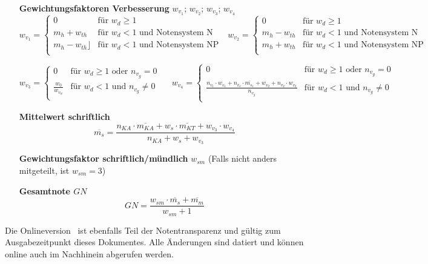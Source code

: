 \begin{enumerate}[label=\textbf{\textbullet}, align=left, leftmargin=*]
\[	\]
	\item[\textbf{Gewichtungsfaktoren Verbesserung}] $w_{v_1}$; $w_{v_2}$; $w_{v_3}$; $w_{v_4}$
	\[
	w_{v_1} =
	\begin{cases}
		0 & \text{für }  w_{d} \geq 1 \\
		m_{h} + w_{th} & \text{für }    w_{d} < 1 \text{ und Notensystem N} \\
		m_{h} - w_{th} \rfloor & \text{für }    w_{d} < 1 \text{ und Notensystem NP} \\
	\end{cases}
	\,\,\,\,
	w_{v_2} =
	\begin{cases}
		0 & \text{für }  w_{d} \geq 1 \\
		m_{h} - w_{th} & \text{für }    w_{d} < 1 \text{ und Notensystem N} \\
		m_{h} + w_{th} & \text{für }    w_{d} < 1 \text{ und Notensystem NP} \\
	\end{cases}
	\]
	
	\[
	w_{v_3} =
	\begin{cases}
		0 & \text{für }  w_{d} \geq 1 \text{ oder } n_{v_g}=0 \\
		\frac{w_{0}}{w_{v_w}} & \text{für }    w_{d} < 1 \text{ und } n_{v_g} \neq 0 \\
	\end{cases}
	\,\,\,\,\,\,\,\,
	w_{v_4} =
	\begin{cases}
		0 & \text{für }  w_{d} \geq 1 \text{ oder } n_{v_g}=0 \\
		\frac{n_{v_1} \cdot w_{v_1} + n_{v_o} \cdot \overline{m_{s_1}} + w_{v_2} + n_{v_2} \cdot w_{v_2}}{n_{v_g}} & \text{für }    w_{d} < 1 \text{ und } n_{v_g} \neq 0 \\
	\end{cases}
	\]	
	\item[\textbf{Mittelwert schriftlich}]
	\vspace{-0.3cm}
	\[
	\overline{m_{s}} = \frac{ n_{KA} \cdot \overline{m_{KA}} + w_s \cdot \overline{m_{KT}} +w_{v_3} \cdot w_{v_4}   }{n_{KA} + w_s + w_{v_3}}
	\]
	\item[\textbf{Gewichtungsfaktor schriftlich/mündlich}] $w_{sm}$ (Falls nicht anders mitgeteilt, ist $w_{sm}=3$)
	\item[\textbf{Gesamtnote $GN$}]
	\[
	GN = \frac{w_{sm} \cdot \overline{m_{s}} + \overline{m_{m}}}{w_{sm}+1}
	\]
\end{enumerate}

\renewcommand\refname{\footnotesize Mathematische Notationen}
\renewcommand{\bibname}{Quellen}

\vfill


\begingroup
\tiny
\setlength{\bibsep}{0pt}


\endgroup

{\tiny Die Onlineversion \onlinedoc \, ist ebenfalls Teil der Notentransparenz und gültig zum Ausgabezeitpunkt dieses Dokumentes. Alle Änderungen sind datiert und können online auch im Nachhinein abgerufen werden.}